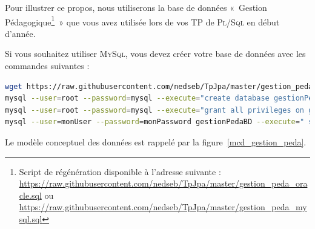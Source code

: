 \documentclass{article}
\begin{document}
Pour illustrer ce propos, nous utiliserons la base de données «~Gestion Pédagogique\footnote{Script de régénération disponible à l'adresse suivante : \url{https://raw.githubusercontent.com/nedseb/TpJpa/master/gestion_peda_oracle.sql} ou \url{https://raw.githubusercontent.com/nedseb/TpJpa/master/gestion_peda_mysql.sql}}~» que vous avez utilisée lors de vos TP de \textsc{Pl/Sql} en début d'année. 

Si vous souhaitez utiliser \textsc{MySql}, vous devez créer votre base de données avec les commandes suivantes :
\begin{lstlisting}[language=bash]
wget https://raw.githubusercontent.com/nedseb/TpJpa/master/gestion_peda_mysql.sql -O ~/net-home/gestion_peda_mysql.sql
mysql --user=root --password=mysql --execute="create database gestionPedaBD"
mysql --user=root --password=mysql --execute="grant all privileges on gestionPedaBD.* to monUser@localhost identified by 'monPassword'"
mysql --user=monUser --password=monPassword gestionPedaBD --execute=" source ~/net-home/gestion_peda_mysql.sql"
\end{lstlisting}

Le modèle conceptuel des données est rappelé par la figure~\ref{mcd_gestion_peda}.
\end{document}
